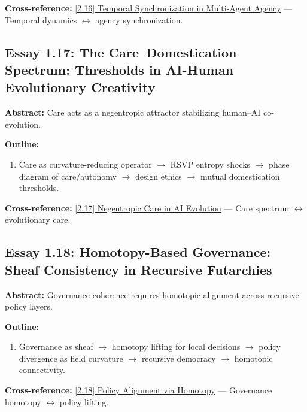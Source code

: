 \documentclass[12pt,a4paper]{article}
\begin{document}
\textbf{Cross-reference:} \hyperref[sec:essay2-16]{[2.16] Temporal Synchronization in Multi-Agent Agency} --- Temporal dynamics $\leftrightarrow$ agency synchronization.

\subsection{Essay 1.17: The Care--Domestication Spectrum: Thresholds in AI-Human Evolutionary Creativity}
\label{sec:essay1-17}

\textbf{Abstract:} Care acts as a negentropic attractor stabilizing human--AI co-evolution.

\textbf{Outline:}
\begin{enumerate}
\item Care as curvature-reducing operator $\to$ RSVP entropy shocks $\to$ phase diagram of care/autonomy $\to$ design ethics $\to$ mutual domestication thresholds.
\end{enumerate}

\textbf{Cross-reference:} \hyperref[sec:essay2-17]{[2.17] Negentropic Care in AI Evolution} --- Care spectrum $\leftrightarrow$ evolutionary care.

\subsection{Essay 1.18: Homotopy-Based Governance: Sheaf Consistency in Recursive Futarchies}
\label{sec:essay1-18}

\textbf{Abstract:} Governance coherence requires homotopic alignment across recursive policy layers.

\textbf{Outline:}
\begin{enumerate}
\item Governance as sheaf $\to$ homotopy lifting for local decisions $\to$ policy divergence as field curvature $\to$ recursive democracy $\to$ homotopic connectivity.
\end{enumerate}

\textbf{Cross-reference:} \hyperref[sec:essay2-18]{[2.18] Policy Alignment via Homotopy} --- Governance homotopy $\leftrightarrow$ policy lifting.

\end{document}
